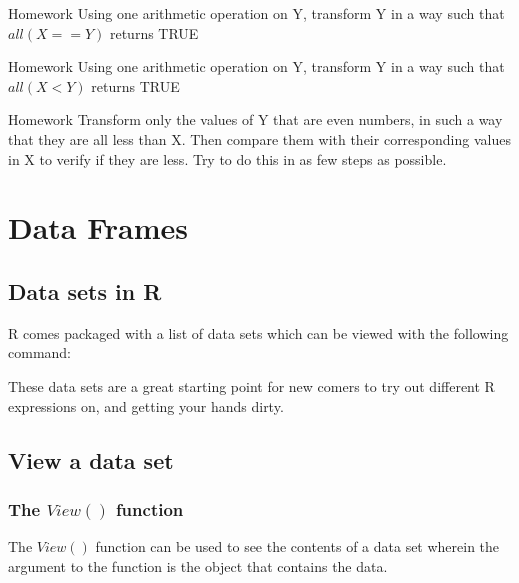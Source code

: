 \documentclass[12pt]{book}\usepackage{knitr}
\begin{document}
\begin{DIY}{Homework}
Using one arithmetic operation on Y, transform Y in a way such that $all(X==Y)$ returns TRUE
\end{DIY}

\begin{DIY}{Homework}
Using one arithmetic operation on Y, transform Y in a way such that $all(X<Y)$ returns TRUE
\end{DIY}

\begin{DIY}{Homework}
Transform only the values of Y that are even numbers, in such a way that they are all less than X. Then compare them with their corresponding values in X to verify if they are less. Try to do this in as few steps as possible.
\end{DIY}


\newpage
\section{Data Frames}
\subsection{Data sets in R}
\noindent R comes packaged with a list of data sets which can be viewed with the following command: 
\begin{knitrout}
\color{fgcolor}\begin{kframe}
\begin{alltt}
\hlstd{(} \hlstd{=} \hlstd{)}
\end{alltt}
\end{kframe}
\end{knitrout}
\noindent These data sets are a great starting point for new comers to try out different R expressions on, and getting your hands dirty. 
\subsection{View a data set}
\subsubsection{The $View()$ function}
\noindent The $View()$ function can be used to see the contents of a data set wherein the argument to the function is the object that contains the data.
\begin{knitrout}
\color{fgcolor}\begin{kframe}
\begin{alltt}
 
\end{alltt}
\end{kframe}
\end{knitrout}
\end{document}
